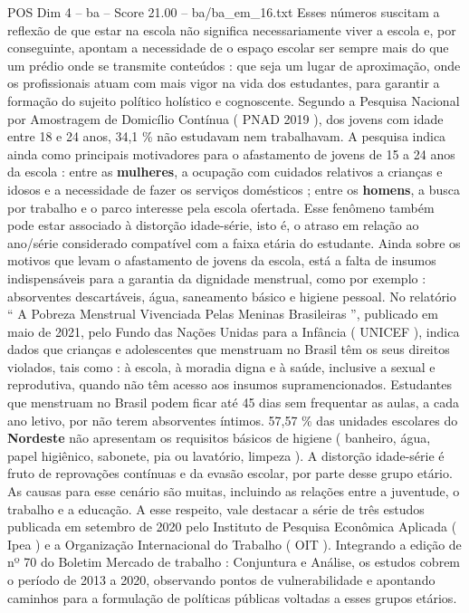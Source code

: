 \begin{textsample}{POS Dim 4 – ba – Score 21.00 – ba/ba\_em\_16.txt}
Esses números suscitam a reflexão de que estar na escola não significa necessariamente viver a escola e, por conseguinte, apontam a necessidade de o espaço escolar ser sempre mais do que um prédio onde se transmite conteúdos : que seja um lugar de aproximação, onde os profissionais atuam com mais vigor na vida dos estudantes, para garantir a formação do sujeito político holístico e cognoscente.
Segundo a Pesquisa Nacional por Amostragem de Domicílio Contínua ( PNAD 2019 ), dos jovens com idade entre 18 e 24 anos, 34,1 \% não estudavam nem trabalhavam.
A pesquisa indica ainda como principais motivadores para o afastamento de jovens de 15 a 24 anos da escola : entre as \textbf{mulheres}, a ocupação com cuidados relativos a crianças e idosos e a necessidade de fazer os serviços domésticos ; entre os \textbf{homens}, a busca por trabalho e o parco interesse pela escola ofertada.
Esse fenômeno também pode estar associado à distorção idade-série, isto é, o atraso em relação ao ano/série considerado compatível com a faixa etária do estudante.
Ainda sobre os motivos que levam o afastamento de jovens da escola, está a falta de insumos indispensáveis para a garantia da dignidade menstrual, como por exemplo : absorventes descartáveis, água, saneamento básico e higiene pessoal.
No relatório “ A Pobreza Menstrual Vivenciada Pelas Meninas Brasileiras ”, publicado em maio de 2021, pelo Fundo das Nações Unidas para a Infância ( UNICEF ), indica dados que crianças e adolescentes que menstruam no Brasil têm os seus direitos violados, tais como : à escola, à moradia digna e à saúde, inclusive a sexual e reprodutiva, quando não têm acesso aos insumos supramencionados.
Estudantes que menstruam no Brasil podem ficar até 45 dias sem frequentar as aulas, a cada ano letivo, por não terem absorventes íntimos. 57,57 \% das unidades escolares do \textbf{Nordeste} não apresentam os requisitos básicos de higiene ( banheiro, água, papel higiênico, sabonete, pia ou lavatório, limpeza ).
A distorção idade-série é fruto de reprovações contínuas e da evasão escolar, por parte desse grupo etário.
As causas para esse cenário são muitas, incluindo as relações entre a juventude, o trabalho e a educação.
A esse respeito, vale destacar a série de três estudos publicada em setembro de 2020 pelo Instituto de Pesquisa Econômica Aplicada ( Ipea ) e a Organização Internacional do Trabalho ( OIT ).
Integrando a edição de nº 70 do Boletim Mercado de trabalho : Conjuntura e Análise, os estudos cobrem o período de 2013 a 2020, observando pontos de vulnerabilidade e apontando caminhos para a formulação de políticas públicas voltadas a esses grupos etários.

\end{textsample}
